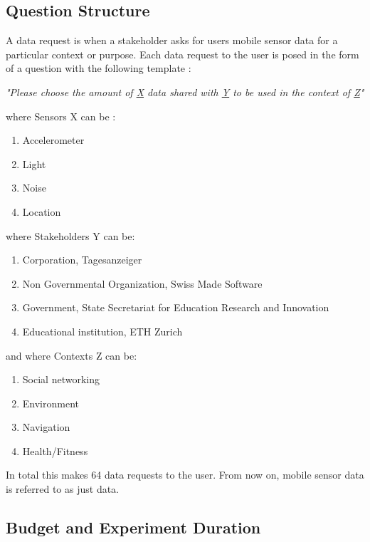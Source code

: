 \subsection{Question Structure} \label{struct}

A data request is when a stakeholder asks for users mobile sensor data for a particular context or purpose. Each data request to the user is posed in the form of a question with the following template :

\textit{"Please choose the amount of \underline{X} data shared with \underline{Y} to be used in the context of \underline{Z}"}

where Sensors X can be :
\begin{enumerate}
    \item Accelerometer
    \item Light
    \item Noise
    \item Location
\end{enumerate}
where Stakeholders Y can be:
\begin{enumerate}
    \item Corporation, Tagesanzeiger 
    \item Non Governmental Organization, Swiss Made Software
    \item Government, State Secretariat for Education Research and Innovation
    \item Educational institution, ETH Zurich
\end{enumerate}
and where Contexts Z can be:
\begin{enumerate}
	\item Social networking
    \item Environment
    \item Navigation
    \item Health/Fitness  
\end{enumerate}

In total this makes 64 data requests to the user. From now on, mobile sensor data is referred to as just data.

\subsection{Budget and Experiment Duration}

